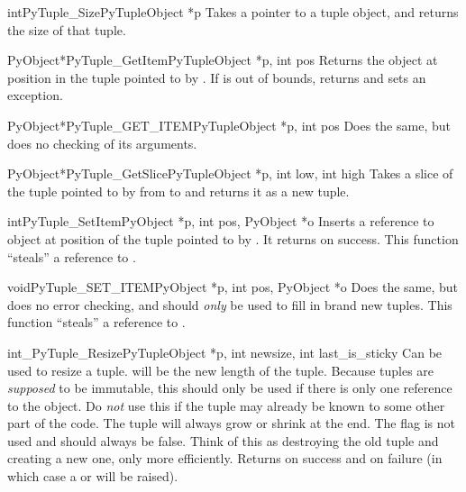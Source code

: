 \documentclass{manual}
\begin{document}
\begin{cfuncdesc}{int}{PyTuple_Size}{PyTupleObject *p}
Takes a pointer to a tuple object, and returns the size
of that tuple.
\end{cfuncdesc}

\begin{cfuncdesc}{PyObject*}{PyTuple_GetItem}{PyTupleObject *p, int pos}
Returns the object at position  in the tuple pointed
to by .  If  is out of bounds, returns \NULL{} and
sets an  exception.
\end{cfuncdesc}

\begin{cfuncdesc}{PyObject*}{PyTuple_GET_ITEM}{PyTupleObject *p, int pos}
Does the same, but does no checking of its arguments.
\end{cfuncdesc}

\begin{cfuncdesc}{PyObject*}{PyTuple_GetSlice}{PyTupleObject *p,
            int low,
            int high}
Takes a slice of the tuple pointed to by  from
 to  and returns it as a new tuple.
\end{cfuncdesc}

\begin{cfuncdesc}{int}{PyTuple_SetItem}{PyObject *p,
                                        int pos, PyObject *o}
Inserts a reference to object  at position  of
the tuple pointed to by . It returns  on success.
  This function ``steals'' a reference to .
\end{cfuncdesc}

\begin{cfuncdesc}{void}{PyTuple_SET_ITEM}{PyObject *p,
                                          int pos, PyObject *o}
Does the same, but does no error checking, and
should \emph{only} be used to fill in brand new tuples.
  This function ``steals'' a reference to .
\end{cfuncdesc}

\begin{cfuncdesc}{int}{_PyTuple_Resize}{PyTupleObject *p,
                                        int newsize, int last_is_sticky}
Can be used to resize a tuple.   will be the new length
of the tuple.  Because tuples are \emph{supposed} to be immutable,
this should only be used if there is only one reference to the object.
Do \emph{not} use this if the tuple may already be known to some other
part of the code.  The tuple will always grow or shrink at the end.  The
 flag is not used and should always be false.  Think
of this as destroying the old tuple and creating a new one, only more
efficiently.  Returns  on success and  on failure (in
which case a  or  will be
raised).
\end{cfuncdesc}
\end{document}
